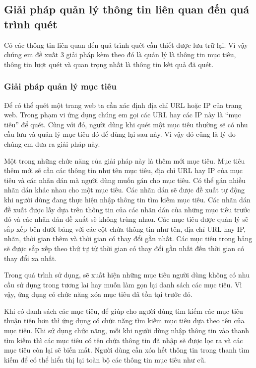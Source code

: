\subsection{Giải pháp quản lý thông tin liên quan đến quá trình quét}

\tab Có các thông tin liên quan đến quá trình quét cần thiết được lưu trữ lại.
Vì vậy chúng em đề xuất 3 giải pháp kèm theo đó là quản lý là thông tin mục tiêu, thông tin lượt quét và quan trọng nhất là thông tin kết quả đã quét.

\subsubsection{Giải pháp quản lý mục tiêu}

\tab Để có thể quét một trang web ta cần xác định địa chỉ URL hoặc IP của trang web.
Trong phạm vi ứng dụng chúng em gọi các URL hay các IP này là “mục tiêu” để quét.
Cùng với đó, người dùng khi quét một mục tiêu thường sẽ có nhu cầu lưu và quản lý mục tiêu đó để dùng lại sau này.
Vì vậy đó cũng là lý do chúng em đưa ra giải pháp này.
\par

Một trong những chức năng của giải pháp này là thêm mới mục tiêu.
Mục tiêu thêm mới sẽ cần các thông tin như tên mục tiêu, địa chỉ URL hay IP của mục tiêu và các nhãn dán mà người dùng muốn gán cho mục tiêu.
Có thể gán nhiều nhãn dán khác nhau cho một mục tiêu.
Các nhãn dán sẽ được đề xuất tự động khi người dùng đang thực hiện nhập thông tin tìm kiếm mục tiêu.
Các nhãn dán đề xuất được lấy dựa trên thông tin của các nhãn dán của những mục tiêu trước đó và các nhãn dán đề xuất sẽ không trùng nhau.
Các mục tiêu được quản lý sẽ sắp xếp bên dưới bảng với các cột chứa thông tin như tên, địa chỉ URL hay IP, nhãn, thời gian thêm và thời gian có thay đổi gần nhất.
Các mục tiêu trong bảng sẽ được sắp xếp theo thứ tự từ thời gian có thay đổi gần nhất đến thời gian có thay đổi xa nhất.
\par

Trong quá trình sử dụng, sẽ xuất hiện những mục tiêu người dùng không có nhu cầu sử dụng trong tương lai hay muốn làm gọn lại danh sách các mục tiêu.
Vì vậy, ứng dụng có chức năng xóa mục tiêu đã tồn tại trước đó.
\par

Khi có danh sách các mục tiêu, để giúp cho người dùng tìm kiếm các mục tiêu thuận tiện hơn thì ứng dụng có chức năng tìm kiếm mục tiêu dựa theo tên của mục tiêu.
Khi sử dụng chức năng, mỗi khi người dùng nhập thông tin vào thanh tìm kiếm thì các mục tiêu có tên chứa thông tin đã nhập sẽ được lọc ra và các mục tiêu còn lại sẽ biến mất.
Người dùng cần xóa hết thông tin trong thanh tìm kiếm để có thể hiển thị lại toàn bộ các thông tin mục tiêu như cũ.
\par

